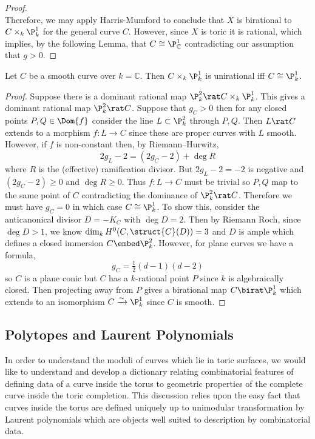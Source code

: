 \begin{proof}
\bigskip\\
Therefore, we may apply Harris-Mumford \cite{Harris_Mumford} to conclude that $X$ is birational to $C \times_k \P^1_k$ for the general curve $C$. However, since $X$ is toric it is rational, which implies, by the following Lemma, that $C \cong \P^1_{\mathbb{C}}$ contradicting our assumption that $g > 0$. 
\end{proof}

\begin{lemma} \label{unirational}
Let $C$ be a smooth curve over $k = \mathbb{C}$. Then $C \times_k \P^1_k$ is unirational iff $C \cong \P^1_k$.
\end{lemma}

\begin{proof}
Suppose there is a dominant rational map $\P^2_k \rat C \times_k \P^1_k$. This gives a dominant rational map $\P^2_k \rat C$. Suppose that $g_C > 0$ then for any closed points $P, Q \in \Dom{f}$ consider the line $L \subset \P^2_k$ through $P, Q$. Then $L \rat C$ extends to a morphism $f : L \to C$ since these are proper curves with $L$ smooth. However, if $f$ is non-constant then, by Riemann–Hurwitz,
\[ 2 g_L - 2 = (2 g_C - 2) + \deg{R} \]
where $R$ is the (effective) ramification divisor. But $2 g_L - 2 = -2$ is negative and $(2 g_C - 2) \ge 0$ and $\deg{R} \ge 0$. Thus $f : L \to C$ must be trivial so $P, Q$ map to the same point of $C$ contradicting the dominance of $\P^2_k \rat C$. Therefore we must have $g_C = 0$ in which case $C \cong \P^1_k$. To show this, consider the anticanonical divisor $D = - K_C$ with $\deg{D} = 2$. Then by Riemann Roch, since $\deg{D} > 1$, we know $\dim_k H^0(C, \struct{C}(D)) = 3$ and $D$ is ample which defines a closed immersion $C \embed \P^2_k$. However, for plane curves we have a formula,
\[ g_C = \tfrac{1}{2} (d - 1)(d - 2) \]
so $C$ is a plane conic but $C$ has a $k$-rational point $P$ since $k$ is algebraically closed. Then projecting away from $P$ gives a birational map $C \birat \P^1_k$ which extends to an isomorphism $C \xrightarrow{\sim} \P^1_k$ since $C$ is smooth.
\end{proof}


\subsection{Polytopes and Laurent Polynomials}

In order to understand the moduli of curves which lie in toric surfaces, we would like to understand and develop a dictionary relating combinatorial features of defining data of a curve inside the torus to geometric properties of the complete curve inside the toric completion. This discussion relies upon the easy fact that curves inside the torus are defined uniquely up to unimodular transformation by Laurent polynomials which are objects well suited to description by combinatorial data.

